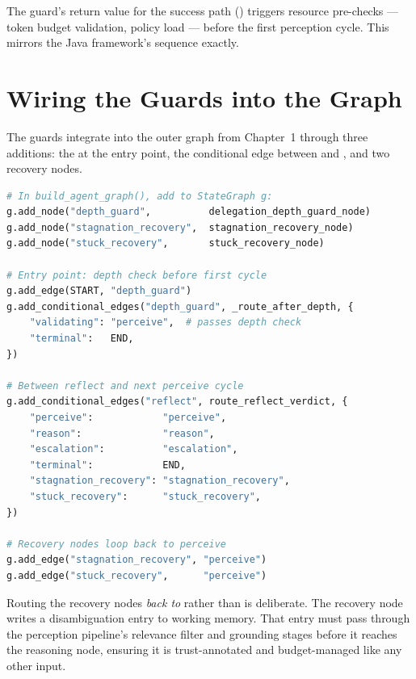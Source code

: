 The guard's return value for the success path ()
triggers resource pre-checks --- token budget validation, policy load ---
before the first perception cycle.  This mirrors the Java framework's
 sequence exactly.

\section{Wiring the Guards into the Graph}
\label{sec:guard-wiring}

The guards integrate into the outer graph from Chapter~1 through three
additions: the  at the entry point,
the  conditional edge between  and
, and two recovery nodes.

\begin{lstlisting}[language=Python,
    caption={Guard nodes added to the outer graph (src/graph.py additions)},
    label={lst:guard-wiring}]
# In build_agent_graph(), add to StateGraph g:
g.add_node("depth_guard",          delegation_depth_guard_node)
g.add_node("stagnation_recovery",  stagnation_recovery_node)
g.add_node("stuck_recovery",       stuck_recovery_node)

# Entry point: depth check before first cycle
g.add_edge(START, "depth_guard")
g.add_conditional_edges("depth_guard", _route_after_depth, {
    "validating": "perceive",  # passes depth check
    "terminal":   END,
})

# Between reflect and next perceive cycle
g.add_conditional_edges("reflect", route_reflect_verdict, {
    "perceive":            "perceive",
    "reason":              "reason",
    "escalation":          "escalation",
    "terminal":            END,
    "stagnation_recovery": "stagnation_recovery",
    "stuck_recovery":      "stuck_recovery",
})

# Recovery nodes loop back to perceive
g.add_edge("stagnation_recovery", "perceive")
g.add_edge("stuck_recovery",      "perceive")
\end{lstlisting}

\medskip

Routing the recovery nodes \emph{back to}  rather than
 is deliberate.  The recovery node writes a disambiguation
entry to working memory.  That entry must pass through the perception
pipeline's relevance filter and grounding stages before it reaches the
reasoning node, ensuring it is trust-annotated and budget-managed like
any other input.

